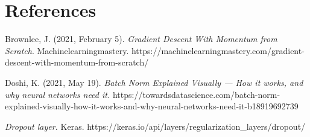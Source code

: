\documentclass[]{article}
\begin{document}
\newpage
\section{References}

\hspace{0.5cm}Brownlee, J. (2021, February 5). \textit{Gradient Descent With Momentum from Scratch}. Machinelearningmastery. https://machinelearningmastery.com/gradient-descent-with-momentum-from-scratch/

Doshi, K. (2021, May 19). \textit{Batch Norm Explained Visually — How it works, and why neural networks need it.} https://towardsdatascience.com/batch-norm-explained-visually-how-it-works-and-why-neural-networks-need-it-b18919692739

\textit{Dropout layer.} Keras. https://keras.io/api/layers/regularization\_layers/dropout/
\end{document}
